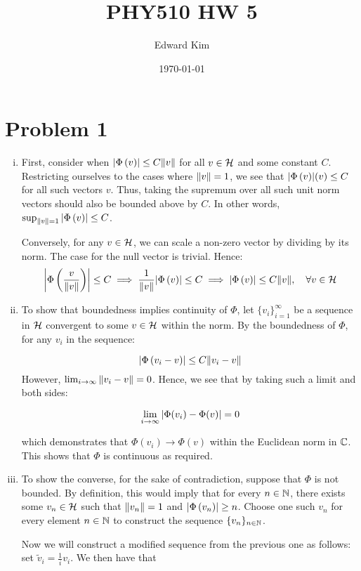 \documentclass[12pt]{article}%
\title{PHY510 HW 5}
\author{Edward Kim}
\date{\today}
\newcommand{\normphi}[1][v]{\abs{\Phi\left({#1}
\right)}}
\begin{document}
\maketitle

\section*{Problem 1}
\begin{enumerate}[i.]
  \item First, consider when $\normphi \leq C\norm{v}$ for all $v \in \mathcal{H}$ and some constant $C$. Restricting ourselves to the cases where $\norm{v} = 1$, we see that $\normphi(v) \leq C$ for all such vectors $v$. Thus, taking the supremum over all such unit norm vectors should also be bounded above by $C$. In other words, $\sup_{\norm{v}= 1}{\normphi} \leq C$.

  Conversely, for any $v \in \mathcal{H}$, we can scale a non-zero vector by dividing by its norm. The case for the null vector is trivial. Hence:
  \[ \normphi[\frac{v}{\norm{v}}] \leq C \implies \frac{1}{\norm{v}}\normphi \leq C \implies \normphi \leq C\norm{v}, \quad \forall v \in \hil\]

  \item
  To show that boundedness implies continuity of $\Phi$, let $\{v_i\}_{i=1}^\infty$ be a sequence in $\mathcal{H}$ convergent to some $v \in \mathcal{H}$ within the norm. By the boundedness of $\Phi$, for any $v_i$ in the sequence:

  \[ \normphi[v_i - v] \leq C\norm{v_i - v} \]
  However, $\lim_{i \rightarrow \infty} \norm{v_i - v} = 0$. Hence, we see that by taking such a limit and both sides:

  \[ \lim_{i \rightarrow \infty}\abs{\Phi(v_i) - \Phi(v)} = 0 \]

  which demonstrates that $\Phi(v_i) \rightarrow \Phi(v)$ within the Euclidean norm in ${\mathbb{C}}$. This shows that $\Phi$ is continuous as required.

  \item
  To show the converse, for the sake of contradiction, suppose that $\Phi$ is not bounded. By definition, this would imply that for every $n \in \mathbb{N}$, there exists some $v_n \in \mathcal{H}$ such that $\norm{v_n} = 1$ and $\normphi[v_n] \geq n$. Choose one such $v_n$ for every element $n \in \mathbb{N}$ to construct the sequence $\{v_n\}_{n \in \mathbb{N}}$.

  Now we will construct a modified sequence from the previous one as follows: set $\tilde{v}_i = \frac{1}{i}v_i$. We then have that


\end{enumerate}
\end{document}
